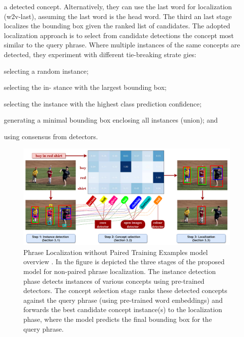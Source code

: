 a detected concept. Alternatively, they can use the last word for
localization (w2v-last), assuming the last word is the head word.
The third an last stage localizes the bounding box given the ranked
list of candidates. The adopted localization approach is to select
from candidate detections the concept most similar to the query
phrase. Where multiple instances of the same concepts are detected,
they experiment with different tie-breaking strate gies:
\begin{enumerate*}[label=(\roman*)] 
  \item selecting a random instance;
  \item selecting the in- stance with the largest bounding box; 
  \item selecting the instance with the highest class prediction
  confidence;
  \item generating a minimal bounding box enclosing all instances
  (union); and
  \item using consensus from detectors. 
\end{enumerate*} 

\begin{figure}
  \centering
  \includegraphics[width=.8\textwidth]{figures/phraseloc-model.png}
  \caption[Phrase Localization without Paired Training Examples
  model overview]{Phrase Localization without Paired Training
  Examples model overview \cite{wang2019phrase}. In the figure is
  depicted the three stages of the proposed model for non-paired
  phrase localization. The instance detection phase detects
  instances of various concepts using pre-trained detectors. The
  concept selection stage ranks these detected concepts against the
  query phrase (using pre-trained word embeddings) and forwards the
  best candidate concept instance(s) to the localization phase,
  where the model predicts the final bounding box for the query
  phrase.}
  \label{fig:phraseloc-model}
\end{figure}


